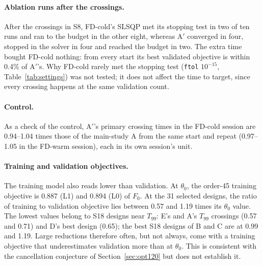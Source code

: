 \documentclass{anvil-paper}
\begin{document}
\paragraph{Ablation runs after the crossings.}
After the crossings in S8, FD-cold's SLSQP met its stopping test in two of ten runs and ran to the
budget in the other eight, whereas A$'$ converged in four, stopped in the
solver in four and reached the budget in two. The extra time bought FD-cold
nothing: from every start its best validated objective is within 0.4\% of
A$'$'s. Why FD-cold rarely met the stopping test (\texttt{ftol} $10^{-15}$,
Table~\ref{tab:settings}) was not tested; it does not affect the time to
target, since every crossing happens at the same validation count.

\paragraph{Control.}
As a check of the control,
A$'$'s primary crossing times in the FD-cold session are 0.94--1.04 times those
of the main-study A from the same start and repeat (0.97--1.05 in the
FD-warm session), each in its own session's unit.

\paragraph{Training and validation objectives.}
The training model also reads lower than validation. At $\theta_0$, the
order-45 training objective is 0.887 (L1) and 0.894 (L0) of $F_0$. At the
31 selected designs, the ratio of training to validation objective lies
between 0.57 and 1.19 times its $\theta_0$ value. The lowest values belong
to S18 designs near $T_{99}$: E's and A's $T_{99}$ crossings (0.57 and
0.71) and D's best design (0.65); the best S18 designs of B and C are at
0.99 and 1.19. Large reductions therefore often, but not always, come with a
training objective that underestimates validation more than at $\theta_0$.
This is consistent with the cancellation conjecture of
Section~\ref{sec:opt120} but does not establish it.
\end{document}
